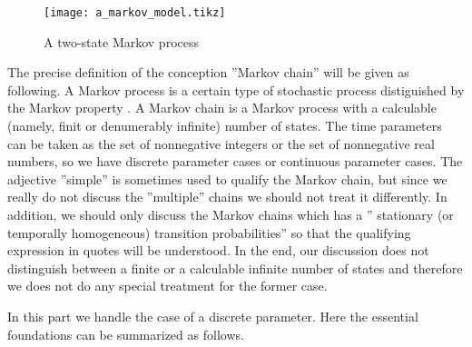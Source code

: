 \begin{figure}[!h]
	\centering
	\texttt{[image: a\_markov\_model.tikz]}
	\caption{A two-state Markov process}
	\label{a two state markov process}
\end{figure}

The precise definition of the conception ''Markov chain'' will be given as following. A Markov process is a certain type of stochastic process distiguished by the Markov property \cite{chung1967markov}. A Markov chain is a Markov process with a calculable (namely, finit or denumerably infinite) number of states. The time parameters can be taken as the set of nonnegative integers or the set of nonnegative real numbers, so we have discrete parameter cases or continuous parameter cases. The adjective ''simple'' is sometimes used to qualify the Markov chain, but since we really do not discuss the ''multiple'' chains we should not treat it differently. In addition, we should only discuss the Markov chains which has a '' stationary (or temporally homogeneous) transition probabilities'' so that the qualifying expression in quotes will be understood. In the end, our discussion does not distinguish between a finite or a calculable infinite number of states and therefore we does not do any special treatment for the former case.

In this part we handle the case of a discrete parameter. Here the essential foundations can be summarized as follows.

